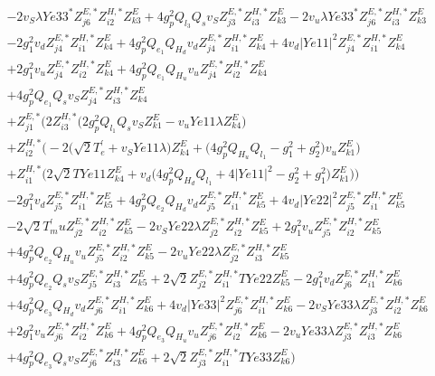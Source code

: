 \begin{align}
 &-2 v_S \lambda Ye33^* Z^{E,*}_{j 6} Z^{H,*}_{i 2} Z_{{k 3}}^{E} +4 g_{p}^{2} Q_{l_3} Q_s v_S Z^{E,*}_{j 3} Z^{H,*}_{i 3} Z_{{k 3}}^{E} -2 v_u \lambda Ye33^* Z^{E,*}_{j 6} Z^{H,*}_{i 3} Z_{{k 3}}^{E} \nonumber \\ 
 &-2 g_{1}^{2} v_d Z^{E,*}_{j 4} Z^{H,*}_{i 1} Z_{{k 4}}^{E} +4 g_{p}^{2} Q_{e_{1}} Q_{H_d} v_d Z^{E,*}_{j 4} Z^{H,*}_{i 1} Z_{{k 4}}^{E} +4 v_d |Ye11|^2 Z^{E,*}_{j 4} Z^{H,*}_{i 1} Z_{{k 4}}^{E} \nonumber \\ 
 &+2 g_{1}^{2} v_u Z^{E,*}_{j 4} Z^{H,*}_{i 2} Z_{{k 4}}^{E} +4 g_{p}^{2} Q_{e_{1}} Q_{H_u} v_u Z^{E,*}_{j 4} Z^{H,*}_{i 2} Z_{{k 4}}^{E} \nonumber \\ 
 &+4 g_{p}^{2} Q_{e_{1}} Q_s v_S Z^{E,*}_{j 4} Z^{H,*}_{i 3} Z_{{k 4}}^{E} \nonumber \\ 
 &+Z^{E,*}_{j 1} \Big(2 Z^{H,*}_{i 3} \Big(2 g_{p}^{2} Q_{l_1} Q_s v_S Z_{{k 1}}^{E}  - v_u Ye11 \lambda Z_{{k 4}}^{E} \Big)\nonumber \\ 
 &+Z^{H,*}_{i 2} \Big(-2 \Big(\sqrt{2} T^{\prime}_e  + v_S Ye11 \lambda \Big)Z_{{k 4}}^{E}  + \Big(4 g_{p}^{2} Q_{H_u} Q_{l_1}  - g_{1}^{2}  + g_{2}^{2}\Big)v_u Z_{{k 1}}^{E} \Big)\nonumber \\ 
 &+Z^{H,*}_{i 1} \Big(2 \sqrt{2} TYe11 Z_{{k 4}}^{E}  + v_d \Big(4 g_{p}^{2} Q_{H_d} Q_{l_1}  + 4 |Ye11|^2  - g_{2}^{2}  + g_{1}^{2}\Big)Z_{{k 1}}^{E} \Big)\Big)\nonumber \\ 
 &-2 g_{1}^{2} v_d Z^{E,*}_{j 5} Z^{H,*}_{i 1} Z_{{k 5}}^{E} +4 g_{p}^{2} Q_{e_{2}} Q_{H_d} v_d Z^{E,*}_{j 5} Z^{H,*}_{i 1} Z_{{k 5}}^{E} +4 v_d |Ye22|^2 Z^{E,*}_{j 5} Z^{H,*}_{i 1} Z_{{k 5}}^{E} \nonumber \\ 
 &-2 \sqrt{2} T^{\prime}_mu Z^{E,*}_{j 2} Z^{H,*}_{i 2} Z_{{k 5}}^{E} -2 v_S Ye22 \lambda Z^{E,*}_{j 2} Z^{H,*}_{i 2} Z_{{k 5}}^{E} +2 g_{1}^{2} v_u Z^{E,*}_{j 5} Z^{H,*}_{i 2} Z_{{k 5}}^{E} \nonumber \\ 
 &+4 g_{p}^{2} Q_{e_{2}} Q_{H_u} v_u Z^{E,*}_{j 5} Z^{H,*}_{i 2} Z_{{k 5}}^{E} -2 v_u Ye22 \lambda Z^{E,*}_{j 2} Z^{H,*}_{i 3} Z_{{k 5}}^{E} \nonumber \\ 
 &+4 g_{p}^{2} Q_{e_{2}} Q_s v_S Z^{E,*}_{j 5} Z^{H,*}_{i 3} Z_{{k 5}}^{E} +2 \sqrt{2} Z^{E,*}_{j 2} Z^{H,*}_{i 1} TYe22 Z_{{k 5}}^{E} -2 g_{1}^{2} v_d Z^{E,*}_{j 6} Z^{H,*}_{i 1} Z_{{k 6}}^{E} \nonumber \\ 
 &+4 g_{p}^{2} Q_{e_3} Q_{H_d} v_d Z^{E,*}_{j 6} Z^{H,*}_{i 1} Z_{{k 6}}^{E} +4 v_d |Ye33|^2 Z^{E,*}_{j 6} Z^{H,*}_{i 1} Z_{{k 6}}^{E} -2 v_S Ye33 \lambda Z^{E,*}_{j 3} Z^{H,*}_{i 2} Z_{{k 6}}^{E} \nonumber \\ 
 &+2 g_{1}^{2} v_u Z^{E,*}_{j 6} Z^{H,*}_{i 2} Z_{{k 6}}^{E} +4 g_{p}^{2} Q_{e_3} Q_{H_u} v_u Z^{E,*}_{j 6} Z^{H,*}_{i 2} Z_{{k 6}}^{E} -2 v_u Ye33 \lambda Z^{E,*}_{j 3} Z^{H,*}_{i 3} Z_{{k 6}}^{E} \nonumber \\ 
 &+4 g_{p}^{2} Q_{e_3} Q_s v_S Z^{E,*}_{j 6} Z^{H,*}_{i 3} Z_{{k 6}}^{E} +2 \sqrt{2} Z^{E,*}_{j 3} Z^{H,*}_{i 1} TYe33 Z_{{k 6}}^{E} \Big)\end{align} 
